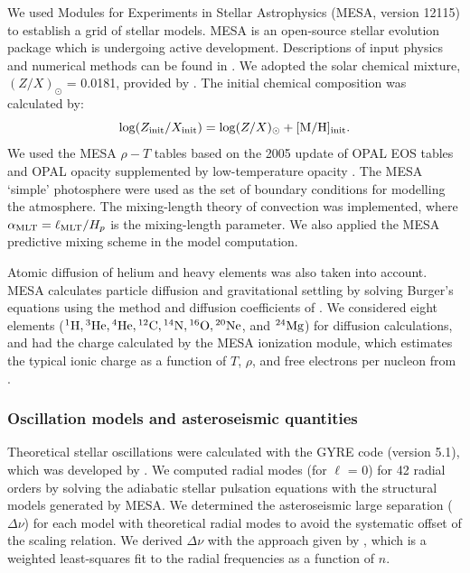 \documentclass[a4paper,fleqn,usenatbib]{mnras}
\newcommand{\dnu}{\ensuremath{\Delta\nu}}
\begin{document}
We used Modules for Experiments in Stellar Astrophysics
(\textsc{MESA}, version 12115) to establish a grid of stellar models. 
\textsc{MESA} is an open-source stellar evolution package which is undergoing active development. 
Descriptions of input physics and numerical methods
can be found in \citet{Paxton.Bildsten.ea2011, Paxton.Cantiello.ea2013, Paxton.Marchant.ea2015, Paxton.Schwab.ea2018, Paxton.Smolec.ea2019}.
We adopted the solar chemical mixture, $(Z/X)_{\odot}$ = 0.0181,
 provided by \citet{Asplund.Grevesse.ea2009}. 
The initial chemical composition was calculated by:
%
\begin{equation}
\log (Z_{\rm{init}}/X_{\rm{init}}) = \log (Z/X)_{\odot} + \rm{[M/H]_{init}}.  \\
\end{equation}
%
We used the \textsc{MESA} $\rho-T$ tables based on the 2005
update of OPAL EOS tables \citep{Rogers.Nayfonov2002} and OPAL opacity
supplemented by low-temperature opacity \citep{Ferguson.Alexander.ea2005}. The MESA ‘simple’ photosphere were used as the set of boundary conditions for modelling the atmosphere.
The mixing-length theory of convection was implemented, where 
$\alpha_{\rm MLT} = \ell_{\rm MLT}/H_p$ is the mixing-length parameter. 
We also applied the \textsc{MESA} predictive mixing scheme \citep{Paxton.Schwab.ea2018, Paxton.Smolec.ea2019} in the model computation. 

Atomic diffusion of helium and heavy elements was also taken into account. MESA calculates particle diffusion and gravitational settling by solving Burger's equations using the method
and diffusion coefficients of \citet{Thoul.Bahcall.ea1994}. We considered eight elements (${}^1{\rm H}, {}^3{\rm He}, {}^4{\rm He}, {}^{12}{\rm C}, {}^{14}{\rm N}, {}^{16}{\rm O}, {}^{20}{\rm Ne}$, and ${}^{24}{\rm Mg}$)
for diffusion calculations, and had the charge calculated by the MESA ionization module, which estimates the typical ionic charge as a function of $T$, $\rho$, and free electrons per nucleon from \citet{Paquette.Pelletier.ea1986}.

\subsubsection{Oscillation models and asteroseismic quantities}\label{subsec:seismo_model}

Theoretical stellar oscillations were calculated with the \textsc{GYRE} code (version 5.1), which was developed by \citet{Townsend.Teitler2013}. We computed radial modes (for $\ell$ = 0) for 42 radial orders by solving the adiabatic stellar pulsation equations with the structural models generated by \textsc{MESA}. We determined the asteroseismic large separation ($\dnu$) for each model with theoretical radial modes to avoid the systematic offset of the scaling relation. We derived $\Delta \nu$ with the approach given by \citet{White.Bedding.ea2011}, which is a weighted least-squares fit to the radial frequencies as a function of $n$.
\end{document}
